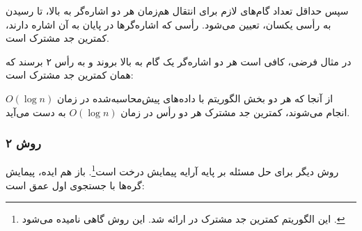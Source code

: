 سپس حداقل تعداد گام‌های لازم برای انتقال هم‌زمان هر دو اشاره‌گر به بالا، تا رسیدن به رأسی یکسان، تعیین می‌شود. رأسی که اشاره‌گرها در پایان به آن اشاره دارند، کمترین جد مشترک است.

در مثال فرضی، کافی است هر دو اشاره‌گر یک گام به بالا بروند و به رأس ۲ برسند که همان کمترین جد مشترک است:

\begin{center}
\end{center}

از آنجا که هر دو بخش الگوریتم با داده‌های پیش‌محاسبه‌شده در زمان $O(\log n)$ انجام می‌شوند، کمترین جد مشترک هر دو رأس در زمان $O(\log n)$ به دست می‌آید.

\subsubsection{روش ۲}

روش دیگر برای حل مسئله بر پایه آرایه پیمایش درخت است\footnote{این الگوریتم کمترین جد مشترک در \cite{ben00} ارائه شد.
این روش گاهی  نامیده می‌شود \cite{tar84}.}.
باز هم ایده، پیمایش گره‌ها با جستجوی اول عمق است:

